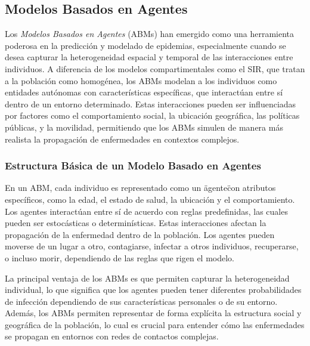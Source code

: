 \subsection{Modelos Basados en Agentes}\label{section:agent-based-models}

Los \textit{Modelos Basados en Agentes} (ABMs) han emergido como una herramienta poderosa en la predicción y modelado de epidemias, especialmente cuando se desea capturar la heterogeneidad espacial y temporal de las interacciones entre individuos. A diferencia de los modelos compartimentales como el SIR, que tratan a la población como homogénea\parencite{Moein2021SIRInefficiency}, los ABMs modelan a los individuos como entidades autónomas con características específicas, que interactúan entre sí dentro de un entorno determinado\parencite{Chowell2016EarlyGrowth}. Estas interacciones pueden ser influenciadas por factores como el comportamiento social, la ubicación geográfica, las políticas públicas, y la movilidad, permitiendo que los ABMs simulen de manera más realista la propagación de enfermedades en contextos complejos\parencite{Mata2021MathematicalEpidemics, Nowzari2016ComplexNetworks}.

\subsubsection{Estructura Básica de un Modelo Basado en Agentes}

En un ABM, cada individuo es representado como un \"agente\" con atributos específicos, como la edad, el estado de salud, la ubicación y el comportamiento. Los agentes interactúan entre sí de acuerdo con reglas predefinidas, las cuales pueden ser estocásticas o determinísticas\parencite{Mata2021MathematicalEpidemics}. Estas interacciones afectan la propagación de la enfermedad dentro de la población. Los agentes pueden moverse de un lugar a otro, contagiarse, infectar a otros individuos, recuperarse, o incluso morir, dependiendo de las reglas que rigen el modelo\parencite{Chowell2016EarlyGrowth}.

La principal ventaja de los ABMs es que permiten capturar la heterogeneidad individual, lo que significa que los agentes pueden tener diferentes probabilidades de infección dependiendo de sus características personales o de su entorno. Además, los ABMs permiten representar de forma explícita la estructura social y geográfica de la población, lo cual es crucial para entender cómo las enfermedades se propagan en entornos con redes de contactos complejas\parencite{Nowzari2016ComplexNetworks}.

